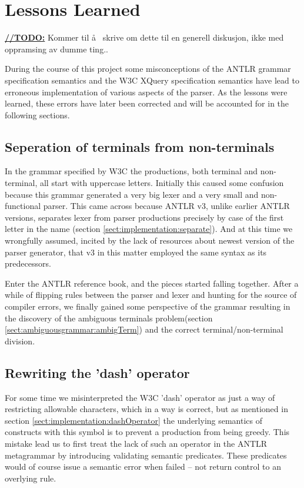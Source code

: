 \section{Lessons Learned}
\label{sect:discussion:deadEnds}
\underline{\textbf{\LARGE //TODO:}} Kommer til \aa~ skrive om dette til en generell diskusjon, ikke med oppramsing av dumme ting..

During the course of this project some misconceptions of the ANTLR grammar specification semantics and the W3C XQuery specification semantics have lead to erroneous implementation of various aspects of the parser. As the lessons were learned, these errors have later been corrected and will be accounted for in the following sections.

\subsection{Seperation of terminals from non-terminals }

In the grammar specified by W3C the productions, both terminal and non-terminal, all start with uppercase letters. Initially this caused some confusion because this grammar generated a very big lexer and a very small and non-functional parser. This came across because ANTLR v3, unlike earlier ANTLR versions, separates lexer from parser productions precisely by case of the first letter in the name (section \ref{sect:implementation:separate}). And at this time we wrongfully assumed, incited by the lack of resources about newest version of the parser generator, that v3 in this matter employed the same syntax as its predecessors.

Enter the ANTLR reference book\cite{definitiveAntlr}, and the pieces started falling together. After a while of flipping rules between the parser and lexer and hunting for the source of compiler errors, we finally gained some perspective of the grammar resulting in the discovery of the ambiguous terminals problem(section \ref{sect:ambiguousgrammar:ambigTerm}) and the correct terminal/non-terminal division.

\subsection{Rewriting the 'dash' operator}

For some time we misinterpreted the W3C 'dash' operator as just a way of restricting allowable characters, which in a way is correct, but as mentioned in section \ref{sect:implementation:dashOperator} the underlying semantics of constructs with this symbol is to prevent a production from being greedy. This mistake lead us to first treat the lack of such an operator in the ANTLR metagrammar by introducing validating semantic predicates. These predicates would of course issue a semantic error when failed -- not return control to an overlying rule.

